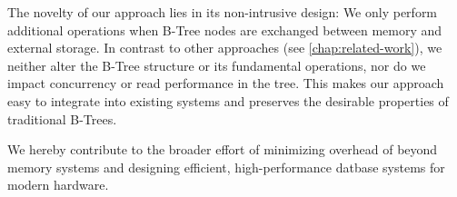 The novelty of our approach lies in its non-intrusive design: We only perform additional operations when B-Tree nodes are exchanged between memory and external storage.
In contrast to other approaches (see \autoref{chap:related-work}), we neither alter the B-Tree structure or its fundamental operations, nor do we impact concurrency or read performance in the tree.
This makes our approach easy to integrate into existing systems and preserves the desirable properties of traditional B-Trees.

We hereby contribute to the broader effort of minimizing overhead of beyond memory systems and designing efficient, high-performance datbase systems for modern hardware.
